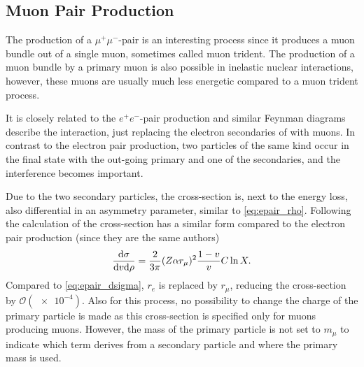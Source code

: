 \subsection{Muon Pair Production} \label{sec:mupair}

The production of a $\mu^+ \mu^-$-pair is an interesting process since it produces a muon bundle out of a single muon, sometimes called muon trident.
The production of a muon bundle by a primary muon is also possible in inelastic nuclear interactions, however, these muons are usually much less energetic compared to a muon trident process.

It is closely related to the $e^+e^-$-pair production and similar Feynman diagrams describe the interaction, just replacing the electron secondaries of  with muons.
In contrast to the electron pair production, two particles of the same kind occur in the final state with the out-going primary and one of the secondaries, and the interference becomes important.

Due to the two secondary particles, the cross-section is, next to the energy loss, also differential in an asymmetry parameter, similar to \eqref{eq:epair_rho}.
Following the calculation of \cite{Kelner00mupair} the cross-section has a similar form compared to the electron pair production (since they are the same authors)
\begin{align} \label{eq:mupair_dsigma}
    \frac{\mathrm{d} \sigma}{\mathrm{d} v \mathrm{d} \rho} =
    \frac{2}{3\pi} (Z \alpha r_\mu)^2 \frac{1 - v}{v} C \operatorname{ln} X .
\end{align}
Compared to \eqref{eq:epair_dsigma}, $r_e$ is replaced by $r_\mu$, reducing the cross-section by $\mathcal{O}(\num{e-4})$.
Also for this process, no possibility to change the charge of the primary particle is made as this cross-section is specified only for muons producing muons.
However, the mass of the primary particle is not set to $m_\mu$ to indicate which term derives from a secondary particle and where the primary mass is used.


